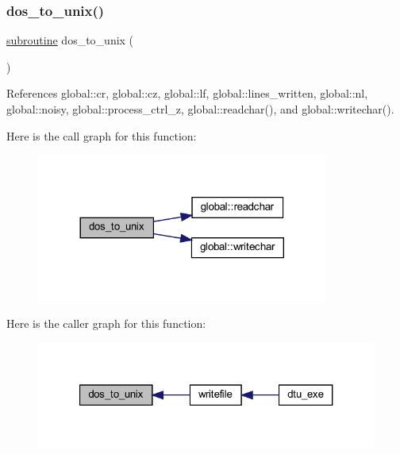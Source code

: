 \subsubsection{\texorpdfstring{dos\+\_\+to\+\_\+unix()}{dos\_to\_unix()}}
{\footnotesize\ttfamily \hyperlink{M__stopwatch_83_8txt_acfbcff50169d691ff02d4a123ed70482}{subroutine} dos\+\_\+to\+\_\+unix (\begin{DoxyParamCaption}{ }\end{DoxyParamCaption})}



References global\+::cr, global\+::cz, global\+::lf, global\+::lines\+\_\+written, global\+::nl, global\+::noisy, global\+::process\+\_\+ctrl\+\_\+z, global\+::readchar(), and global\+::writechar().

Here is the call graph for this function\+:
\nopagebreak
\begin{figure}[H]
\begin{center}
\leavevmode
\includegraphics[width=272pt]{dtu_8f90_a2106e8eae75b8f66312eadae9a00d01f_cgraph}
\end{center}
\end{figure}
Here is the caller graph for this function\+:
\nopagebreak
\begin{figure}[H]
\begin{center}
\leavevmode
\includegraphics[width=321pt]{dtu_8f90_a2106e8eae75b8f66312eadae9a00d01f_icgraph}
\end{center}
\end{figure}
\mbox{\label{dtu_8f90_abff0f15f5d5e680978944e8d3530395a}} 
